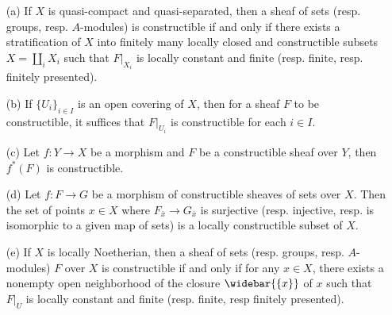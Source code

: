 \begin{proposition}\label{scheme etale constructible sheaf prop}
\mbox{}
\begin{enumerate}
    \item[(a)] If $X$ is quasi-compact and quasi-separated, then a sheaf of sets (resp. groups, resp. $A$-modules) is constructible if and only if there exists a stratification of $X$ into finitely many locally closed and constructible subsets $X=\coprod_iX_i$ such that $F|_{X_i}$ is locally constant and finite (resp. finite, resp. finitely presented).
    \item[(b)] If $\{U_i\}_{i\in I}$ is an open covering of $X$, then for a sheaf $F$ to be constructible, it suffices that $F|_{U_i}$ is constructible for each $i\in I$.
    \item[(c)] Let $f:Y\to X$ be a morphism and $F$ be a constructible sheaf over $Y$, then $f^*(F)$ is constructible.
    \item[(d)] Let $f:F\to G$ be a morphism of constructible sheaves of sets over $X$. Then the set of points $x\in X$ where $F_{\bar{x}}\to G_{\bar{x}}$ is surjective (resp. injective, resp. is isomorphic to a given map of sets) is a locally constructible subset of $X$.
    \item[(e)] If $X$ is locally Noetherian, then a sheaf of sets (resp. groups, resp. $A$-modules) $F$ over $X$ is constructible if and only if for any $x\in X$, there exists a nonempty open neighborhood of the closure $\widebar{\{x\}}$ of $x$ such that $F|_U$ is locally constant and finite (resp. finite, resp finitely presented).
\end{enumerate}
\end{proposition}
